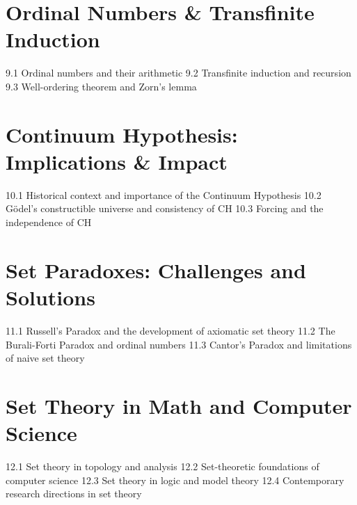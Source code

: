 \section{Ordinal Numbers \& Transfinite Induction}
9.1 Ordinal numbers and their arithmetic
9.2 Transfinite induction and recursion
9.3 Well-ordering theorem and Zorn's lemma
\section{Continuum Hypothesis: Implications \& Impact}
10.1 Historical context and importance of the Continuum Hypothesis
10.2 Gödel's constructible universe and consistency of CH
10.3 Forcing and the independence of CH
\section{Set Paradoxes: Challenges and Solutions}
11.1 Russell's Paradox and the development of axiomatic set theory
11.2 The Burali-Forti Paradox and ordinal numbers
11.3 Cantor's Paradox and limitations of naive set theory
\section{Set Theory in Math and Computer Science}
12.1 Set theory in topology and analysis
12.2 Set-theoretic foundations of computer science
12.3 Set theory in logic and model theory
12.4 Contemporary research directions in set theory
